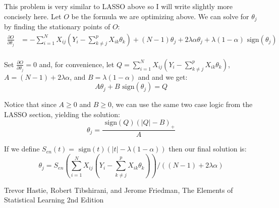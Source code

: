 \documentclass[12pt]{article}
\newcommand{\sgn}{\text{ sign}}
\begin{document}
This problem is very similar to LASSO above so I will write slightly more concisely here.  Let $O$ be the formula we are optimizing above.  We can solve for $\theta_j$ by finding the stationary points of $O$:
\begin{equation}\begin{split}
	\frac{\partial O}{\partial \theta_j}
		& = -\sum\limits_{i=1}^N X_{ij}(Y_i - \sum\limits_{k \ne j}^p X_{ik}\theta_k) +(N-1)\theta_j + 2\lambda\alpha\theta_j + \lambda(1-\alpha)\sgn(\theta_j) \\
\end{split}\end{equation}

Set $\frac{\partial O}{\partial \theta_j}=0$ and, for convenience, let $Q = \sum\limits_{i=1}^N X_{ij}(Y_i - \sum\limits_{k \ne j}^p X_{ik}\theta_k)$, $A=(N-1)+2\lambda\alpha$, and $B=\lambda(1-\alpha)$ and and we get:
	$$A\theta_j + B\sgn(\theta_j) = Q$$

Notice that since $A \geq 0$ and $B \geq 0$, we can use the same two case logic from the LASSO section, yielding the solution:
	$$\theta_j = \frac{\sgn(Q)(|Q|-B)_+}{A}$$

If we define $S_{en}(t)= \sgn(t)(|t|-\lambda(1-\alpha))$ then our final solution is:
	$$\theta_j = S_{en}\left(\sum\limits_{i=1}^N X_{ij}(Y_i - \sum\limits_{k \ne j}^p X_{ik}\theta_k)\right)/\left((N-1)+2\lambda\alpha\right)$$

\begin{thebibliography}{9}
Trevor Hastie, Robert Tibshirani, and Jerome Friedman,
The Elements of Statistical Learning 2nd Edition
\end{thebibliography}
\end{document}
